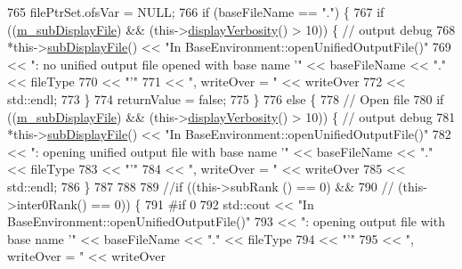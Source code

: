 \begin{DoxyCode}
765   filePtrSet.ofsVar = NULL;
766   \textcolor{keywordflow}{if} (baseFileName == \textcolor{stringliteral}{"."}) \{
767     \textcolor{keywordflow}{if} ((\hyperlink{class_q_u_e_s_o_1_1_base_environment_a52b4275aa8ee85994dd304d9fe95c9c5}{m\_subDisplayFile}) && (this->\hyperlink{class_q_u_e_s_o_1_1_base_environment_a1fe5f244fc0316a0ab3e37463f108b96}{displayVerbosity}() > 10)) \{ \textcolor{comment}{// output
       debug}
768       *this->\hyperlink{class_q_u_e_s_o_1_1_base_environment_a8a0064746ae8dddfece4229b9ad374d6}{subDisplayFile}() << \textcolor{stringliteral}{"In BaseEnvironment::openUnifiedOutputFile()"}
769                               << \textcolor{stringliteral}{": no unified output file opened with base name '"} << baseFileName << \textcolor{stringliteral}{"."} 
      << fileType
770                               << \textcolor{stringliteral}{"'"}
771                               << \textcolor{stringliteral}{", writeOver = "} << writeOver
772                               << std::endl;
773     \}
774     returnValue = \textcolor{keyword}{false};
775   \}
776   \textcolor{keywordflow}{else} \{
778     \textcolor{comment}{// Open file}
780 \textcolor{comment}{}    \textcolor{keywordflow}{if} ((\hyperlink{class_q_u_e_s_o_1_1_base_environment_a52b4275aa8ee85994dd304d9fe95c9c5}{m\_subDisplayFile}) && (this->\hyperlink{class_q_u_e_s_o_1_1_base_environment_a1fe5f244fc0316a0ab3e37463f108b96}{displayVerbosity}() > 10)) \{ \textcolor{comment}{// output
       debug}
781       *this->\hyperlink{class_q_u_e_s_o_1_1_base_environment_a8a0064746ae8dddfece4229b9ad374d6}{subDisplayFile}() << \textcolor{stringliteral}{"In BaseEnvironment::openUnifiedOutputFile()"}
782                               << \textcolor{stringliteral}{": opening unified output file with base name '"} << baseFileName << \textcolor{stringliteral}{"."} <<
       fileType
783                               << \textcolor{stringliteral}{"'"}
784                               << \textcolor{stringliteral}{", writeOver = "} << writeOver
785                               << std::endl;
786     \}
787 
788 
789     \textcolor{comment}{//if ((this->subRank   () == 0) &&}
790     \textcolor{comment}{//    (this->inter0Rank() == 0)) \{}
791 \textcolor{preprocessor}{#if 0}
792 \textcolor{preprocessor}{}      std::cout << \textcolor{stringliteral}{"In BaseEnvironment::openUnifiedOutputFile()"}
793                 << \textcolor{stringliteral}{": opening output file with base name '"} << baseFileName << \textcolor{stringliteral}{"."} << fileType
794                 << \textcolor{stringliteral}{"'"}
795                 << \textcolor{stringliteral}{", writeOver = "} << writeOver

\end{DoxyCode}
